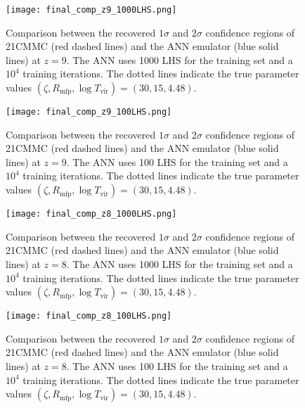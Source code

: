 \documentclass[useAMS,usenatbib]{mnras}
\begin{document}
\begin{figure}
\texttt{[image: final\_comp\_z9\_1000LHS.png]}
\caption{Comparison between the recovered $1\sigma$ and $2\sigma$ confidence regions of 21CMMC (red dashed lines) and the ANN emulator (blue solid lines) at $z = 9$. The ANN uses 1000 LHS for the training set and a $10^4$ training iterations. The dotted lines indicate the true parameter values $(\zeta, R_\text{mfp}, \log T_\text{vir}) = (30, 15, 4.48)$.}
\label{fig: mcmc 1000LHS z9}
\end{figure}

\begin{figure}
\texttt{[image: final\_comp\_z9\_100LHS.png]}
\caption{Comparison between the recovered $1\sigma$ and $2\sigma$ confidence regions of 21CMMC (red dashed lines) and the ANN emulator (blue solid lines) at $z = 9$. The ANN uses 100 LHS for the training set and a $10^4$ training iterations. The dotted lines indicate the true parameter values $(\zeta, R_\text{mfp}, \log T_\text{vir}) = (30, 15, 4.48)$.}
\label{fig: mcmc 100LHS z9}
\end{figure}


\begin{figure}
\texttt{[image: final\_comp\_z8\_1000LHS.png]}
\caption{Comparison between the recovered $1\sigma$ and $2\sigma$ confidence regions of 21CMMC (red dashed lines) and the ANN emulator (blue solid lines) at $z = 8$. The ANN uses 1000 LHS for the training set and a $10^4$ training iterations. The dotted lines indicate the true parameter values $(\zeta, R_\text{mfp}, \log T_\text{vir}) = (30, 15, 4.48)$.}
\label{fig: mcmc 1000LHS z8}
\end{figure}
\begin{figure}
\texttt{[image: final\_comp\_z8\_100LHS.png]}
\caption{Comparison between the recovered $1\sigma$ and $2\sigma$ confidence regions of 21CMMC (red dashed lines) and the ANN emulator (blue solid lines) at $z = 8$. The ANN uses 100 LHS for the training set and a $10^4$ training iterations. The dotted lines indicate the true parameter values $(\zeta, R_\text{mfp}, \log T_\text{vir}) = (30, 15, 4.48)$.}
\label{fig: mcmc 100LHS z8}
\end{figure}
\end{document}
